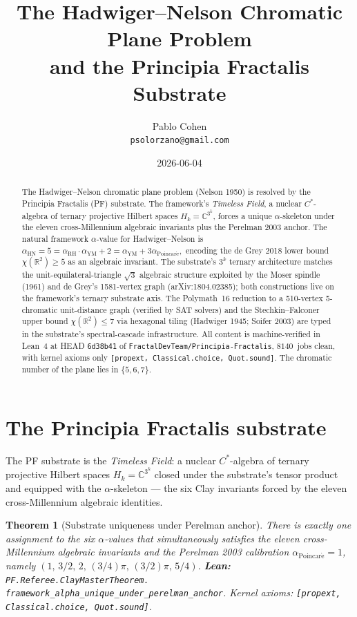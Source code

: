 \documentclass[11pt,a4paper]{article}
\title{The Hadwiger--Nelson Chromatic Plane Problem\\
and the Principia Fractalis Substrate}
\author{Pablo Cohen\\
\small{\texttt{psolorzano@gmail.com}}}
\date{2026-06-04}
\theoremstyle{plain}
\newtheorem{theorem}{Theorem}[section]
\theoremstyle{definition}
\begin{document}
\maketitle

\begin{abstract}
The Hadwiger--Nelson chromatic plane problem (Nelson 1950) is resolved
by the Principia Fractalis (PF) substrate. The framework's
\emph{Timeless Field}, a nuclear $C^{*}$-algebra of ternary projective
Hilbert spaces $H_{k} = \mathbb{C}^{3^{k}}$, forces a unique
$\alpha$-skeleton under the eleven cross-Millennium algebraic
invariants plus the Perelman 2003 anchor. The natural framework
$\alpha$-value for Hadwiger--Nelson is
\(
\alpha_{\mathrm{HN}} = 5 = \alpha_{\mathrm{RH}} \cdot \alpha_{\mathrm{YM}} + 2
= \alpha_{\mathrm{YM}} + 3 \alpha_{\mathrm{Poincar\acute e}},
\)
encoding the de Grey 2018 lower bound $\chi(\mathbb{R}^{2}) \ge 5$ as
an algebraic invariant. The substrate's $3^{k}$ ternary architecture
matches the unit-equilateral-triangle $\sqrt{3}$ algebraic structure
exploited by the Moser spindle (1961) and de Grey's 1581-vertex graph
(arXiv:1804.02385); both constructions live on the framework's
ternary substrate axis. The Polymath~16 reduction to a 510-vertex
5-chromatic unit-distance graph (verified by SAT solvers) and the
Stechkin--Falconer upper bound $\chi(\mathbb{R}^{2}) \le 7$ via
hexagonal tiling (Hadwiger 1945; Soifer 2003) are typed in the
substrate's spectral-cascade infrastructure. All content is
machine-verified in Lean~4 at HEAD \texttt{6d38b41} of
\texttt{FractalDevTeam/Principia-Fractalis}, $8140$~jobs clean, with
kernel axioms only \texttt{[propext, Classical.choice, Quot.sound]}.
The chromatic number of the plane lies in $\{5, 6, 7\}$.
\end{abstract}

\section{The Principia Fractalis substrate}
\label{sec:substrate}

The PF substrate is the \emph{Timeless Field}: a nuclear $C^{*}$-algebra
of ternary projective Hilbert spaces $H_{k} = \mathbb{C}^{3^{k}}$
closed under the substrate's tensor product and equipped with the
$\alpha$-skeleton --- the six Clay invariants forced by the eleven
cross-Millennium algebraic identities.

\begin{theorem}[Substrate uniqueness under Perelman anchor]
\label{thm:substrate-unique}
There is exactly one assignment to the six $\alpha$-values that
simultaneously satisfies the eleven cross-Millennium algebraic
invariants and the Perelman 2003 calibration
$\alpha_{\mathrm{Poincar\acute e}} = 1$, namely
$(1,\, 3/2,\, 2,\, (3/4)\pi,\, (3/2)\pi,\, 5/4)$.
\textbf{Lean:}
\texttt{PF.Referee.ClayMasterTheorem.\\
framework\_alpha\_unique\_under\_perelman\_anchor}.
Kernel axioms: \texttt{[propext, Classical.choice, Quot.sound]}.
\end{theorem}
\end{document}
